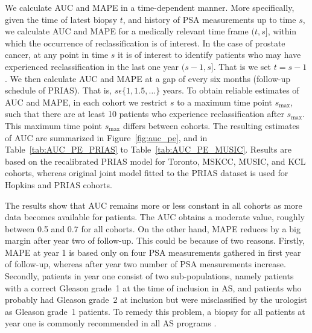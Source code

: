 We calculate AUC and MAPE in a time-dependent manner. More specifically, given the time of latest biopsy $t$, and history of PSA measurements up to time $s$, we calculate AUC and MAPE for a medically relevant time frame $(t, s]$, within which the occurrence of reclassification is of interest. In the case of prostate cancer, at any point in time $s$ it is of interest to identify patients who may have experienced reclassification in the last one year $(s-1, s]$. That is we set $t=s-1$. We then calculate AUC and MAPE at a gap of every six months (follow-up schedule of PRIAS). That is, $s \epsilon \{1, 1.5, \ldots \}$ years. To obtain reliable estimates of AUC and MAPE, in each cohort we restrict $s$ to a maximum time point $s_{\mbox{max}}$, such that there are at least 10 patients who experience reclassification after $s_{\mbox{max}}$. This maximum time point $s_{\mbox{max}}$ differs between cohorts. The resulting estimates of AUC are summarized in Figure~\ref{fig:auc_pe}, and in Table~\ref{tab:AUC_PE_PRIAS} to Table~\ref{tab:AUC_PE_MUSIC}. Results are based on the recalibrated PRIAS model for Toronto, MSKCC, MUSIC, and KCL cohorts, whereas original joint model fitted to the PRIAS dataset is used for Hopkins and PRIAS cohorts.

The results show that AUC remains more or less constant in all cohorts as more data becomes available for patients. The AUC obtains a moderate value, roughly between 0.5 and 0.7 for all cohorts. On the other hand, MAPE reduces by a big margin after year two of follow-up. This could be because of two reasons. Firstly, MAPE at year 1 is based only on four PSA measurements gathered in first year of follow-up, whereas after year two number of PSA measurements increase. Secondly, patients in year one consist of two sub-populations, namely patients with a correct Gleason grade~1 at the time of inclusion in AS, and patients who probably had Gleason grade~2 at inclusion but were misclassified by the urologist as Gleason grade~1 patients. To remedy this problem, a biopsy for all patients at year one is commonly recommended in all AS programs \citep{bokhorst2015compliance}.

